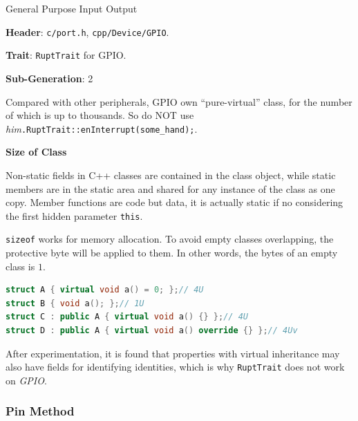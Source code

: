 General Purpose Input Output

\textbf{Header}: \verb|c/port.h|, \verb|cpp/Device/GPIO|.

\textbf{Trait}: \verb|RuptTrait| for GPIO.

\textbf{Sub-Generation}: 2

Compared with other peripherals, GPIO own ``pure-virtual'' class, for the number of which is up to thousands. So do NOT use \textit{him}\verb|.RuptTrait::enInterrupt(some_hand);|.

\textbf{Size of Class}

Non-static fields in C++ classes are contained in the class object, while static members are in the static area and shared for any instance of the class as one copy. Member functions are code but data, it is actually static if no considering the first hidden parameter \verb|this|.

\verb|sizeof| works for memory allocation. To avoid empty classes overlapping, the protective byte will be applied to them. In other words, the bytes of an empty class is $1$.

\begin{lstlisting}[language=C++]
struct A { virtual void a() = 0; };// 4U
struct B { void a(); };// 1U
struct C : public A { virtual void a() {} };// 4U
struct D : public A { virtual void a() override {} };// 4Uv
\end{lstlisting}

After experimentation, it is found that properties with virtual inheritance may also have fields for identifying identities, which is why \verb|RuptTrait| does not work on \textit{GPIO}.



\subsubsection{Pin Method}

